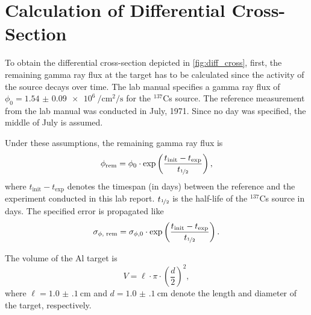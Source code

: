 \Appendix
\configureappendix

\section{Calculation of Differential Cross-Section}\label{appendix:cross}

To obtain the differential cross-section depicted in \autoref{fig:diff_cross}, first, the remaining gamma ray flux at the target has to be calculated since the activity of the source decays over time.
The lab manual specifies a gamma ray flux of $\phi_0 = \SI{1.54(9)e6}{\per\cm\squared\per\second}$ for the $^{137}$Cs source.
The reference measurement from the lab manual was conducted in July, 1971.
Since no day was specified, the middle of July is assumed.

Under these assumptions, the remaining gamma ray flux is
\begin{equation*}
	\phi_\text{rem} = \phi_0\cdot\exp\left(\frac{t_\text{init}-t_\text{exp}}{t_{\nicefrac{1}{2}}}\right),
\end{equation*}
where $t_\text{init}-t_\text{exp}$ denotes the timespan (in days) between the reference and the experiment conducted in this lab report.
$t_{\nicefrac{1}{2}}$ is the half-life of the $^{137}$Cs source in days.
The specified error is propagated like
\begin{equation*}
	\sigma_{\phi\text{, rem}} = \sigma_{\phi,0}\cdot\exp\left(\frac{t_\text{init}-t_\text{exp}}{t_{\nicefrac{1}{2}}}\right).
\end{equation*}

The volume of the Al target is
\begin{equation*}
	V = \ell\cdot\pi\cdot\left(\frac{d}{2}\right)^2,
\end{equation*}
where $\ell=\SI{1.0(1)}{\cm}$ and $d=\SI{1.0(1)}{\cm}$ denote the length and diameter of the target, respectively.
